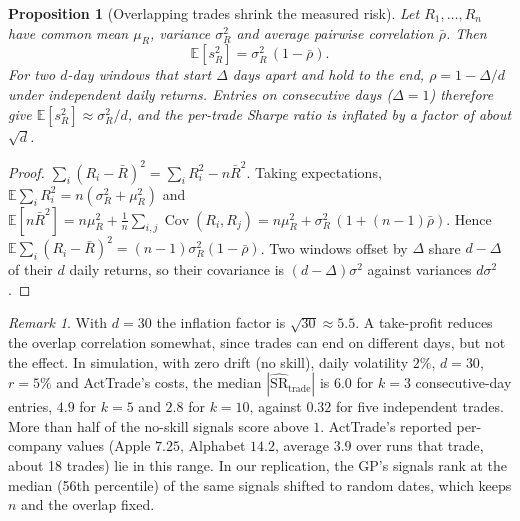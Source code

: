 \documentclass[11pt,a4paper]{article}
\newtheorem{proposition}{Proposition}
\theoremstyle{remark}
\newtheorem*{remark}{Remark}
\newcommand{\E}{\mathbb{E}}
\newcommand{\Cov}{\operatorname{Cov}}
\newcommand{\SR}{\mathrm{SR}}
\begin{document}
\begin{proposition}[Overlapping trades shrink the measured risk]\label{prop:overlap}
Let $R_1,\dots,R_n$ have common mean $\mu_R$, variance $\sigma_R^2$ and average pairwise correlation $\bar\rho$. Then
\begin{equation}
\E[s_R^2] = \sigma_R^2\,(1-\bar\rho).\label{eq:svar}
\end{equation}
For two $d$-day windows that start $\Delta$ days apart and hold to the end, $\rho = 1-\Delta/d$ under independent daily returns. Entries on consecutive days ($\Delta=1$) therefore give $\E[s_R^2]\approx \sigma_R^2/d$, and the per-trade Sharpe ratio is inflated by a factor of about $\sqrt{d}$.
\end{proposition}
\begin{proof}
$\sum_i (R_i-\bar R)^2 = \sum_i R_i^2 - n\bar R^2$. Taking expectations, $\E\sum_i R_i^2 = n(\sigma_R^2+\mu_R^2)$ and $\E[n\bar R^2] = n\mu_R^2 + \frac1n\sum_{i,j}\Cov(R_i,R_j) = n\mu_R^2 + \sigma_R^2\,(1+(n-1)\bar\rho)$. Hence $\E\sum_i(R_i-\bar R)^2 = (n-1)\sigma_R^2(1-\bar\rho)$. Two windows offset by $\Delta$ share $d-\Delta$ of their $d$ daily returns, so their covariance is $(d-\Delta)\sigma^2$ against variances $d\sigma^2$.
\end{proof}

\begin{remark}
With $d=30$ the inflation factor is $\sqrt{30}\approx 5.5$. A take-profit reduces the overlap correlation somewhat, since trades can end on different days, but not the effect. In simulation, with zero drift (no skill), daily volatility $2\%$, $d=30$, $r=5\%$ and ActTrade's costs, the median $|\widehat{\SR}_{\mathrm{trade}}|$ is $6.0$ for $k=3$ consecutive-day entries, $4.9$ for $k=5$ and $2.8$ for $k=10$, against $0.32$ for five independent trades. More than half of the no-skill signals score above $1$. ActTrade's reported per-company values (Apple $7.25$, Alphabet $14.2$, average $3.9$ over runs that trade, about 18 trades) lie in this range. In our replication, the GP's signals rank at the median (56th percentile) of the same signals shifted to random dates, which keeps $n$ and the overlap fixed.
\end{remark}
\end{document}
